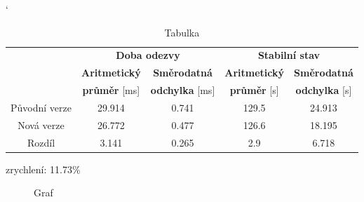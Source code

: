             \begin{table}[ht]
             \catcode`
             \begin{center}
              \begin{tabular}{| c || c | c || c | c |} \hline
                \multirow{3}{*}{}   &    \multicolumn{2}{c||}{\textbf{Doba odezvy}}  &  \multicolumn{2}{c|}{\textbf{Stabilní stav}}\\ \cline{2-5}
                 & \textbf{Aritmetický}  &  \textbf{Směrodatná}  &  \textbf{Aritmetický} &  \textbf{Směrodatná}\\ 
                 & \textbf{průměr} [ms]  &  \textbf{odchylka} [ms]  &  \textbf{průměr} [s]  &  \textbf{odchylka} [s]\\ \hline
                Původní verze & 29.914 &  0.741 &  129.5 &  24.913 \\\hline
                Nová verze & 26.772 &  0.477 &  126.6 &  18.195\\\hline
                Rozdíl &  3.141  &  0.265  &  2.9  &  6.718\\\hline  
              \end{tabular}
              \caption{Tabulka}
              \label{tab2}
             \end{center}
            \end{table}


        zrychlení: 11.73\%            
		
                    
            \begin{figure}[h!t]
                \begin{center}
                    \caption{Graf}
                    \label{imgGetMainPageCely}
                \end{center}
            \end{figure}

